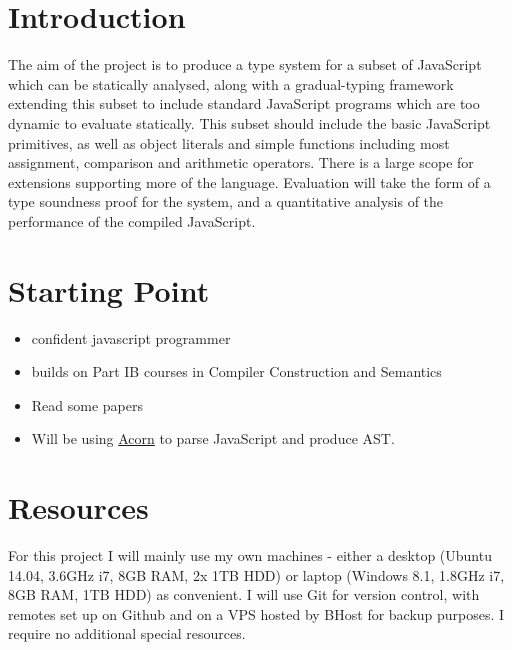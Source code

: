 


\section{Introduction}\label{introduction}

The aim of the project is to produce a type system for a subset of
JavaScript which can be statically analysed, along with a gradual-typing
framework extending this subset to include standard JavaScript programs
which are too dynamic to evaluate statically. This subset should include
the basic JavaScript primitives, as well as object literals and simple
functions including most assignment, comparison and arithmetic
operators. There is a large scope for extensions supporting more of the
language. Evaluation will take the form of a type soundness proof for
the system, and a quantitative analysis of the performance of the
compiled JavaScript.

\section{Starting Point}\label{starting-point}

\begin{itemize}
\itemsep1pt\parskip0pt
\item
  confident javascript programmer
\item
  builds on Part IB courses in Compiler Construction and Semantics
\item
  Read some papers
\item
  Will be using \href{https://www.npmjs.org/package/acorn}{Acorn} to
  parse JavaScript and produce AST.
\end{itemize}

\section{Resources}\label{resources}

For this project I will mainly use my own machines - either a desktop
(Ubuntu 14.04, 3.6GHz i7, 8GB RAM, 2x 1TB HDD) or laptop (Windows 8.1,
1.8GHz i7, 8GB RAM, 1TB HDD) as convenient. I will use Git for version
control, with remotes set up on Github and on a VPS hosted by BHost for
backup purposes. I require no additional special resources.

